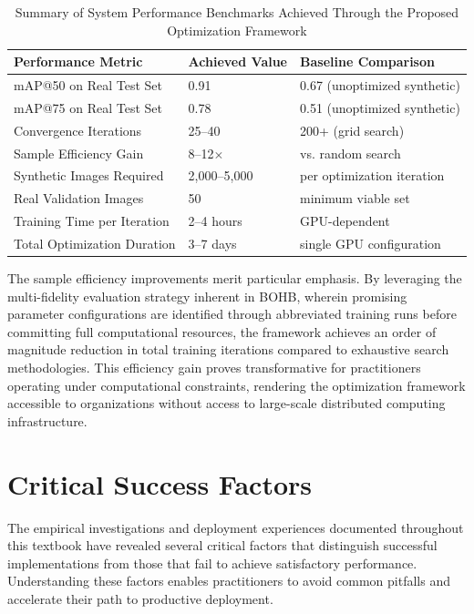 \begin{table}[htbp]
\centering
\caption{Summary of System Performance Benchmarks Achieved Through the Proposed Optimization Framework}
\label{tab:performance_summary}
\begin{tabular}{p{}p{}p{}}
\toprule
\textbf{Performance Metric} & \textbf{Achieved Value} & \textbf{Baseline Comparison} \\
\midrule
mAP@50 on Real Test Set & 0.91 & 0.67 (unoptimized synthetic) \\
mAP@75 on Real Test Set & 0.78 & 0.51 (unoptimized synthetic) \\
Convergence Iterations & 25--40 & 200+ (grid search) \\
Sample Efficiency Gain & 8--12$\times$ & vs. random search \\
Synthetic Images Required & 2,000--5,000 & per optimization iteration \\
Real Validation Images & 50 & minimum viable set \\
Training Time per Iteration & 2--4 hours & GPU-dependent \\
Total Optimization Duration & 3--7 days & single GPU configuration \\
\bottomrule
\end{tabular}
\end{table}

The sample efficiency improvements merit particular emphasis. By leveraging the multi-fidelity evaluation strategy inherent in BOHB, wherein promising parameter configurations are identified through abbreviated training runs before committing full computational resources, the framework achieves an order of magnitude reduction in total training iterations compared to exhaustive search methodologies. This efficiency gain proves transformative for practitioners operating under computational constraints, rendering the optimization framework accessible to organizations without access to large-scale distributed computing infrastructure.

\section{Critical Success Factors}
\label{sec:success_factors}

The empirical investigations and deployment experiences documented throughout this textbook have revealed several critical factors that distinguish successful implementations from those that fail to achieve satisfactory performance. Understanding these factors enables practitioners to avoid common pitfalls and accelerate their path to productive deployment.

